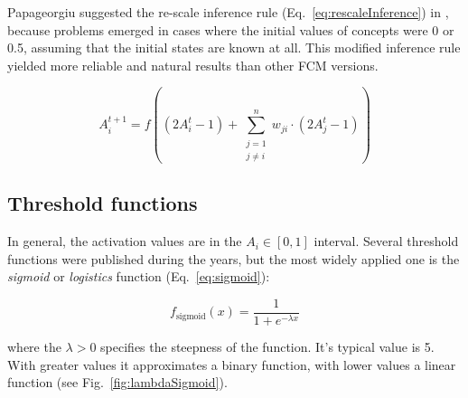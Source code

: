 \documentclass[graybox]{svmult}
\begin{document}
Papageorgiu suggested the re-scale inference rule (Eq.~\ref{eq:rescaleInference}) in \cite{papageorgioue.i.2011}, because problems emerged in cases where the initial values of concepts were 0 or 0.5, assuming that the initial states are known at all. This modified inference rule yielded more reliable and natural results than other FCM versions.

\begin{equation}
\label{eq:rescaleInference}
A_{i}^{t+1} = f \left( (2A_i^t-1) + \sum_{\substack{j=1\\j \ne i}}^{n} w_{ji}\cdot(2A_j^t-1) \right)
\end{equation}

\subsection{Threshold functions}

In general, the activation values are in the $A_{i}\in[0, 1]$ interval. Several threshold functions were published during the years, but the most widely applied one is the \emph{sigmoid} or \emph{logistics} function (Eq.~\ref{eq:sigmoid}):

\begin{equation}
\label{eq:sigmoid}
f_{\textrm{sigmoid}}(x) = \frac{1}{1+e^{-\lambda x}}
\end{equation}

where the $\lambda > 0$ specifies the steepness of the function. It's typical value is 5. With greater values it approximates a binary function, with lower values a linear function (see Fig.~\ref{fig:lambdaSigmoid}). 
\end{document}
